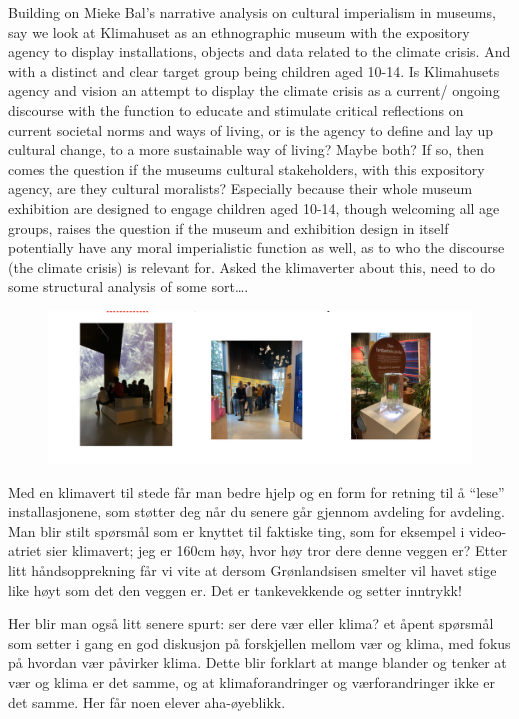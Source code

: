 Building on Mieke Bal’s narrative analysis on cultural imperialism in museums, say we look at Klimahuset as an ethnographic museum with the expository agency to display installations, objects and data related to the climate crisis. And with a distinct and clear target group being children aged 10-14. Is Klimahusets agency and vision an attempt to display the climate crisis as a current/ ongoing discourse with the function to educate and stimulate critical reflections on current societal norms and ways of living, or is the agency to define and lay up cultural change, to a more sustainable way of living? Maybe both? If so, then comes the question if the museums cultural stakeholders, with this expository agency, are they cultural moralists? Especially because their whole museum exhibition are designed to engage children aged 10-14, though welcoming all age groups, raises the question if the museum and exhibition design in itself potentially have any moral imperialistic function as well, as to who the discourse (the climate crisis) is relevant for. 
Asked the klimaverter about  this, need to do some structural analysis of some sort….

\begin{figure}[H]
\includegraphics[width=13cm]{pictures/elever_i_klimahuset.png}
\centering 
\end{figure}

Med en klimavert til stede får man bedre hjelp og en form for retning til å “lese” installasjonene, som støtter deg når du senere går gjennom avdeling for avdeling. 
Man blir stilt spørsmål som er knyttet til faktiske ting, som for eksempel i video-atriet sier klimavert; jeg er 160cm høy, hvor høy tror dere denne veggen er?
Etter litt håndsopprekning får vi vite at dersom Grønlandsisen smelter vil havet stige like høyt som det den veggen er. Det er tankevekkende og setter inntrykk!

Her blir man også litt senere spurt: ser dere vær eller klima? et åpent spørsmål som setter i gang en god diskusjon på forskjellen mellom vær og klima, med fokus på hvordan vær påvirker klima. Dette blir forklart at mange blander og tenker at vær og klima er det samme, og at klimaforandringer og værforandringer ikke er det samme. Her får noen elever aha-øyeblikk.


